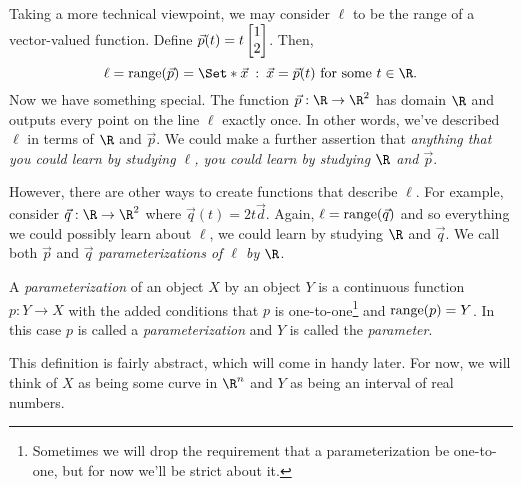 Taking a more technical viewpoint, we may consider $\ell$ to be the range of 
a vector-valued function.  Define $\vec p(t) = t\mat{1\\2}$.  Then,
\[
	\ell = \Range(\vec p) = \Set*{\vec x\given \vec x=\vec p(t)\text{ for some }t\in\R}.
\]
Now we have something special.  The function $\vec p:\R\to\R^2$ has domain $\R$ and outputs
every point on the line $\ell$ exactly once.  In other words, we've described
$\ell$ in terms of $\R$ and $\vec p$.  We could make a further assertion
that \emph{anything that you could learn by studying $\ell$, you could learn
by studying $\R$ and $\vec p$}.

However, there are other ways to create functions that describe $\ell$.
For example, consider $\vec q:\R\to\R^2$ where $\vec q(t)=2t\vec d$.  Again,
$\ell = \operatorname{range}(\vec q)$ and so everything we could possibly learn about
$\ell$, we could learn by studying $\R$ and $\vec q$.
We call both $\vec p$ and $\vec q$ \emph{parameterizations of $\ell$ by $\R$}.

\begin{definition}[Parameterization]
	A \emph{parameterization} of an object $X$ by an object $Y$ is a continuous
	function $p:Y\to X$ with the added conditions that $p$ is one-to-one\footnote{
	Sometimes we will drop the requirement that a parameterization be one-to-one,
	but for now we'll be strict about it.}
	and $\operatorname{range}(p)= Y$.  In this case $p$ is called a \emph{parameterization} and $Y$ is
	called the \emph{parameter}.
\end{definition}

This definition is fairly abstract, which will come in handy later. For
now, we will think of $X$ as being some curve in $\R^n$ and $Y$ as being an
interval of real numbers.

